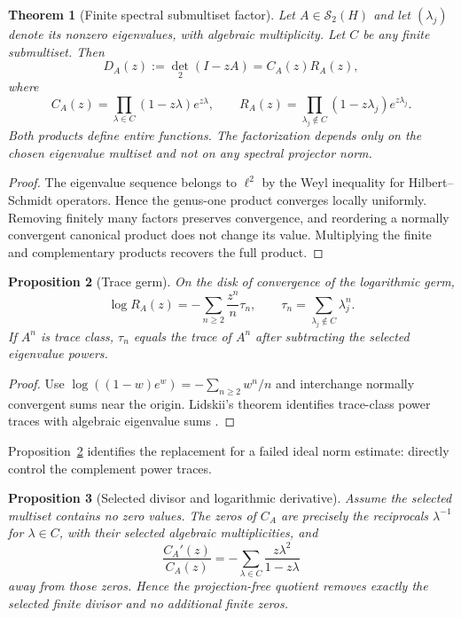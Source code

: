 \documentclass[11pt]{article}
\newtheorem{theorem}{Theorem}[section]
\newtheorem{proposition}[theorem]{Proposition}
\theoremstyle{remark}
\newcommand{\Schatten}{\mathcal S}
\begin{document}
\begin{theorem}[Finite spectral submultiset factor]\label{thm:factor}
Let $A\in\Schatten_2(H)$ and let $(\lambda_j)$ denote its nonzero eigenvalues,
with algebraic multiplicity.  Let $C$ be any finite submultiset.  Then
\[
 D_A(z):=\det_2(I-zA)=C_A(z)R_A(z),
\]
where
\[
 C_A(z)=\prod_{\lambda\in C}(1-z\lambda)e^{z\lambda},
\qquad
 R_A(z)=\prod_{\lambda_j\notin C}(1-z\lambda_j)e^{z\lambda_j}.
\]
Both products define entire functions.  The factorization depends only on the
chosen eigenvalue multiset and not on any spectral projector norm.
\end{theorem}

\begin{proof}
The eigenvalue sequence belongs to $\ell^2$ by the Weyl inequality for
Hilbert--Schmidt operators.  Hence the genus-one product converges locally
uniformly.  Removing finitely many factors preserves convergence, and
reordering a normally convergent canonical product does not change its value.
Multiplying the finite and complementary products recovers the full product.
\end{proof}

\begin{proposition}[Trace germ]\label{prop:trace}
On the disk of convergence of the logarithmic germ,
\[
 \log R_A(z)=-\sum_{n\ge2}\frac{z^n}{n}\tau_n,
 \qquad
 \tau_n=\sum_{\lambda_j\notin C}\lambda_j^n.
\]
If $A^n$ is trace class, $\tau_n$ equals the trace of $A^n$ after subtracting
the selected eigenvalue powers.
\end{proposition}

\begin{proof}
Use $\log((1-w)e^w)=-\sum_{n\ge2}w^n/n$ and interchange normally convergent
sums near the origin.  Lidskii's theorem identifies trace-class power traces
with algebraic eigenvalue sums \citep{Simon2005}.
\end{proof}

Proposition~\ref{prop:trace} identifies the replacement for a failed ideal
norm estimate: directly control the complement power traces.

\begin{proposition}[Selected divisor and logarithmic derivative]
Assume the selected multiset contains no zero values.  The zeros of $C_A$
are precisely the reciprocals $\lambda^{-1}$ for $\lambda\in C$, with their
selected algebraic multiplicities, and
\[
 \frac{C_A'(z)}{C_A(z)}
 =-\sum_{\lambda\in C}\frac{z\lambda^2}{1-z\lambda}
\]
away from those zeros.  Hence the projection-free quotient removes exactly
the selected finite divisor and no additional finite zeros.
\end{proposition}
\end{document}
